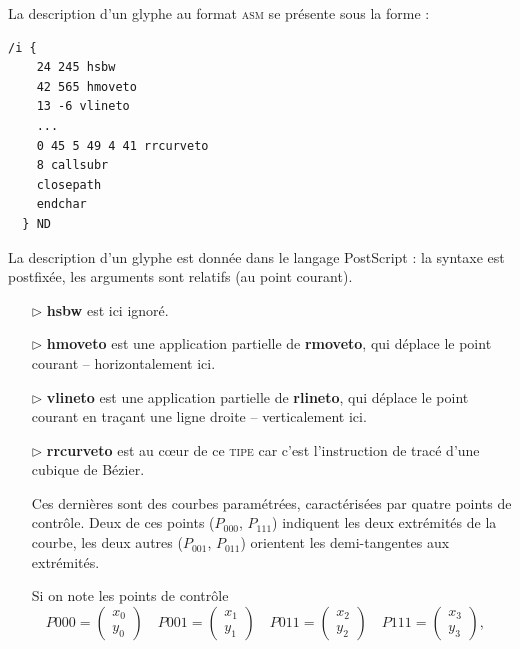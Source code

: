 \documentclass[10pt,twoside,french,a4paper]{article}
\begin{document}
La description d'un glyphe au format \textsc{asm} se présente sous la forme :

\begin{lstlisting}[title={\fbox{Extrait de la description du glyphe de \emph{i} en Garamond}}]
  /i {
    24 245 hsbw
    42 565 hmoveto
    13 -6 vlineto
    ...
    0 45 5 49 4 41 rrcurveto
    8 callsubr
    closepath
    endchar
  } ND
\end{lstlisting}

\medskip

La description d'un glyphe est donnée dans le langage PostScript : la syntaxe est postfixée, les arguments sont relatifs (au point courant).

\medskip

\begin{itemize}

\item[$\rhd$]
  \textbf{hsbw} est ici ignoré.

\item[$\rhd$]
  \textbf{hmoveto} est une application partielle de \textbf{rmoveto}, qui déplace le point courant -- horizontalement ici.

\item[$\rhd$]
  \textbf{vlineto} est une application partielle de \textbf{rlineto}, qui déplace le point courant en traçant une ligne droite -- verticalement ici.
  
\item[$\rhd$]
  \textbf{rrcurveto} est au c\oe ur de ce \textsc{tipe} car c'est l'instruction de tracé d'une cubique de Bézier.

  Ces dernières sont des courbes paramétrées, caractérisées par quatre points de contrôle. Deux de ces points ($P_{000}$, $P_{111}$)  indiquent les deux extrémités de la courbe, les deux autres ($P_{001}$, $P_{011}$) orientent les demi-tangentes aux extrémités.
  
  Si on note les points de contrôle
  $
  \quad P000 = \begin{pmatrix}x_0\\y_0\end{pmatrix}
    \quad P001 = \begin{pmatrix}x_1\\y_1\end{pmatrix}
      \quad P011 = \begin{pmatrix}x_2\\y_2\end{pmatrix} 
        \quad P111 = \begin{pmatrix}x_3\\y_3\end{pmatrix}
          $,
          

\end{itemize}
\end{document}
